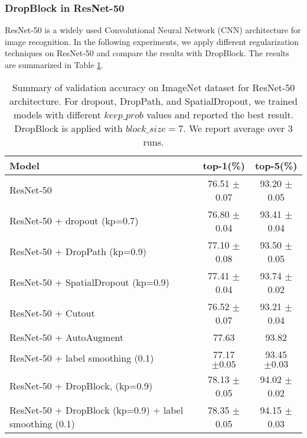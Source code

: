 \documentclass{article}
\begin{document}
\subsubsection{DropBlock in ResNet-50}

ResNet-50 \cite{he2016deep} is a widely used Convolutional
Neural Network (CNN) architecture for image recognition. In the following experiments, we apply different regularization techniques on ResNet-50 and compare the results with DropBlock. The results are summarized in Table \ref{resnet50}.


\begin{table}[h!]
\setlength{\tabcolsep}{8pt}
\begin{center}
\small
\begin{tabular}{>{\footnotesize}l|>{\footnotesize}c>{\footnotesize}c}
\hline
  \footnotesize Model  & \footnotesize top-1(\%) & \footnotesize top-5(\%)\\
\hline \hline
\footnotesize ResNet-50                                         & 76.51  $\pm$ 0.07 & 93.20 $\pm$ 0.05\\ 
\hline
\footnotesize ResNet-50 + dropout (kp=0.7) \cite{dropout2014}   & 76.80 $\pm$ 0.04 & 93.41 $\pm$ 0.04 \\ 
\hline
\footnotesize ResNet-50 + DropPath (kp=0.9) \cite{fractalnet2017}          &77.10  $\pm$ 0.08 & 93.50 $\pm$ 0.05\\
\hline
\footnotesize ResNet-50 + SpatialDropout (kp=0.9) \cite{tompson2015spatialdropout}                & 77.41 $\pm$ 0.04 & 93.74 $\pm$ 0.02 \\
\hline
\footnotesize ResNet-50 + Cutout \cite{Cutout2017}                               & 76.52  $\pm$ 0.07 & 93.21  $\pm$ 0.04 \\ 
\hline
\footnotesize ResNet-50 + AutoAugment \cite{cubuk2018autoaugment}                         & 77.63 & 93.82 \\ 
\hline
\footnotesize ResNet-50 + label smoothing (0.1)  \cite{smoothsoftmax2015}                         & 77.17 $\pm0.05$ & 93.45 $\pm 0.03$\\
\hline
\hline
\footnotesize ResNet-50 + DropBlock, (kp=0.9)       & 78.13 $\pm$ 0.05 &  94.02 $\pm$ 0.02\\
\footnotesize ResNet-50 + DropBlock (kp=0.9) + label smoothing (0.1)     & 78.35 $\pm$ 0.05 &  94.15 $\pm$ 0.03\\ 
\hline
\end{tabular}
\end{center}
\caption{Summary of validation accuracy on ImageNet dataset for ResNet-50 architecture. For dropout, DropPath, and SpatialDropout, we trained models with different $keep\_prob$ values and reported the best result. DropBlock is applied with $block\_size=7$. We report average over 3 runs.}
\label{resnet50}
\end{table}
\end{document}
